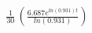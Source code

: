 \documentclass[preview]{standalone}
\begin{document}
\begin{align*}
\frac{1}{30}\,(\frac{6.687e^{ln(0.931)t}}{ln(0.931)})
\end{align*}
\end{document}
